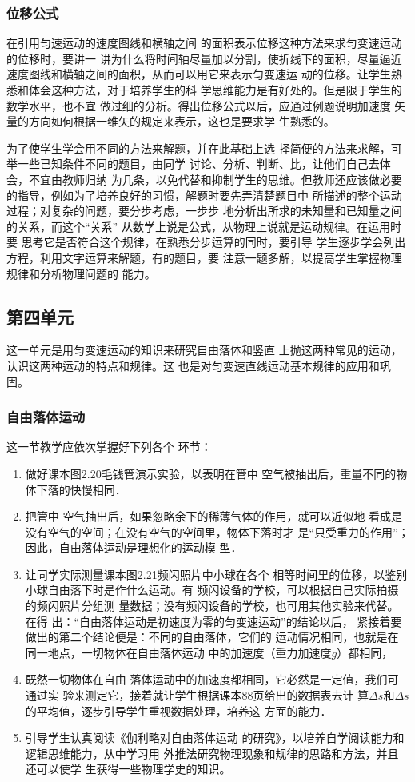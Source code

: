 \subsubsection{位移公式}

在引用匀速运动的速度图线和横轴之间
的面积表示位移这种方法来求匀变速运动的位移时，要讲一
讲为什么将时间轴尽量加以分割，使折线下的面积，尽量逼近
速度图线和横轴之间的面积，从而可以用它来表示匀变速运
动的位移。让学生熟悉和体会这种方法，对于培养学生的科
学思维能力是有好处的。但是限于学生的数学水平，也不宜
做过细的分析。得出位移公式以后，应通过例题说明加速度
矢量的方向如何根据一维矢的规定来表示，这也是要求学
生熟悉的。

为了使学生学会用不同的方法来解题，并在此基础上选
择简便的方法来求解，可举一些已知条件不同的题目，由同学
讨论、分析、判断、比，让他们自己去体会，不宜由教师归纳
为几条，以免代替和抑制学生的思维。但教师还应该做必要
的指导，例如为了培养良好的习惯，解题时要先弄清楚题目中
所描述的整个运动过程；对复杂的问题，要分步考虑，一步步
地分析出所求的未知量和已知量之间的关系，而这个“关系”
从数学上说是公式，从物理上说就是运动规律。在运用时要
思考它是否符合这个规律，在熟悉分步运算的同时，要引导
学生逐步学会列出方程，利用文字运算来解题，有的题目，要
注意一题多解，以提高学生掌握物理规律和分析物理问题的
能力。

\subsection{第四单元}
这一单元是用匀变速运动的知识来研究自由落体和竖直
上抛这两种常见的运动，认识这两种运动的特点和规律。这
也是对匀变速直线运动基本规律的应用和巩固。

\subsubsection{自由落体运动}

这一节教学应依次掌握好下列各个
环节：
\begin{enumerate}
\item 做好课本图2.20毛钱管演示实验，以表明在管中
空气被抽出后，重量不同的物体下落的快慢相同．
\item 把管中
空气抽出后，如果忽略余下的稀薄气体的作用，就可以近似地
看成是没有空气的空间；在没有空气的空间里，物体下落时才
是“只受重力的作用”；因此，自由落体运动是理想化的运动模
型．
\item 让同学实际测量课本图2.21频闪照片中小球在各个
相等时间里的位移，以鉴别小球自由落下时是作什么运动。有
频闪设备的学校，可以根据自己实际拍摄的频闪照片分组测
量数据；没有频闪设备的学校，也可用其他实验来代替。在得
出：“自由落体运动是初速度为零的匀变速运动”的结论以后，
紧接着要做出的第二个结论便是：不同的自由落体，它们的
运动情况相同，也就是在同一地点，一切物体在自由落体运动
中的加速度（重力加速度$g$）都相同，
\item 既然一切物体在自由
落体运动中的加速度都相同，它必然是一定值，我们可通过实
验来测定它，接着就让学生根据课本88页给出的数据表去计
算$\Delta s$和$\Delta s$的平均值，逐步引导学生重视数据处理，培养这
方面的能力．   
 \item 引导学生认真阅读《伽利略对自由落体运动
的研究》，以培养自学阅读能力和逻辑思维能力，从中学习用
外推法研究物理现象和规律的思路和方法，并且还可以使学
生获得一些物理学史的知识。
\end{enumerate}


